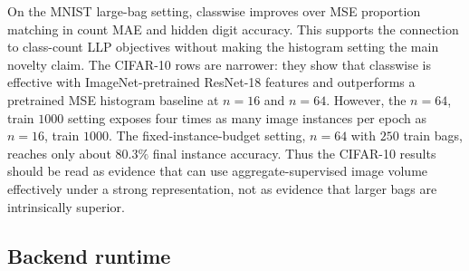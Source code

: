 
On the MNIST large-bag setting, classwise \method{} improves over MSE proportion matching in count MAE and hidden digit accuracy.
This supports the connection to class-count LLP objectives without making the histogram setting the main novelty claim.
The CIFAR-10 rows are narrower: they show that classwise \method{} is effective with ImageNet-pretrained ResNet-18 features and outperforms a pretrained MSE histogram baseline at $n=16$ and $n=64$.
However, the $n=64$, train $1000$ setting exposes four times as many image instances per epoch as $n=16$, train $1000$.
The fixed-instance-budget setting, $n=64$ with $250$ train bags, reaches only about $80.3\%$ final instance accuracy.
Thus the CIFAR-10 results should be read as evidence that \method{} can use aggregate-supervised image volume effectively under a strong representation, not as evidence that larger bags are intrinsically superior.

\subsection{Backend runtime}

